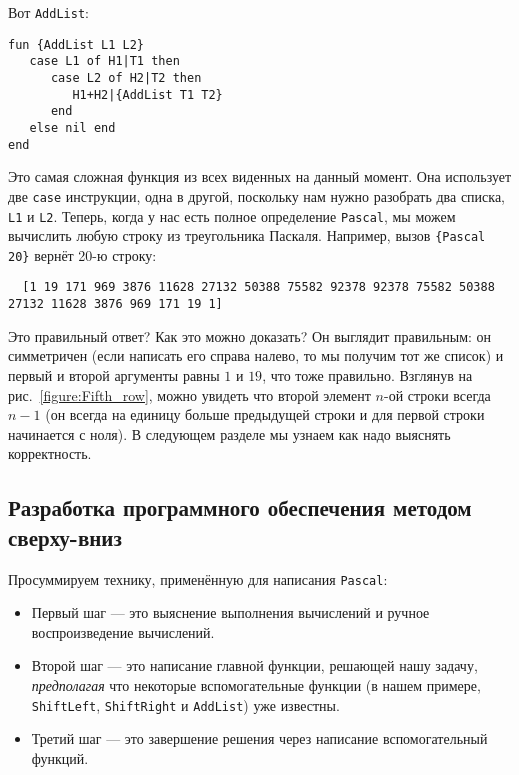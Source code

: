 Вот \lstinline|AddList|:

\begin{lstlisting}
fun {AddList L1 L2}
   case L1 of H1|T1 then
      case L2 of H2|T2 then
         H1+H2|{AddList T1 T2}
      end
   else nil end
end
\end{lstlisting}

Это самая сложная функция из всех виденных на данный момент. Она использует две \lstinline|case| инструкции, одна в другой, поскольку нам нужно разобрать два списка, \lstinline|L1| и \lstinline|L2|. Теперь, когда у нас есть полное определение \lstinline|Pascal|, мы можем вычислить любую строку из треугольника Паскаля. Например, вызов \lstinline|{Pascal 20}| вернёт 20-ю строку:

\begin{lstlisting}
  [1 19 171 969 3876 11628 27132 50388 75582 92378 92378 75582 50388 27132 11628 3876 969 171 19 1]
\end{lstlisting}

Это правильный ответ? Как это можно доказать? Он выглядит правильным: он симметричен (если написать его справа налево, то мы получим тот же список) и первый и второй аргументы равны $1$ и $19$, что тоже правильно. Взглянув на рис.~\ref{figure:Fifth_row}, можно увидеть что второй элемент $n$-ой строки всегда $n-1$ (он всегда на единицу больше предыдущей строки и для первой строки начинается с ноля). В следующем разделе мы узнаем как надо выяснять корректность.

\subsection{Разработка программного обеспечения методом сверху-вниз}

Просуммируем технику, применённую для написания \lstinline|Pascal|:

\begin{itemize}
\item{Первый шаг --- это выяснение выполнения вычислений и ручное воспроизведение вычислений.}

\item{Второй шаг --- это написание главной функции, решающей нашу задачу, \emph{предполагая} что некоторые вспомогательные функции (в нашем примере, \lstinline|ShiftLeft|, \lstinline|ShiftRight| и \lstinline|AddList|) уже известны.}

\item{Третий шаг --- это завершение решения через написание вспомогательный функций.}
\end{itemize}

